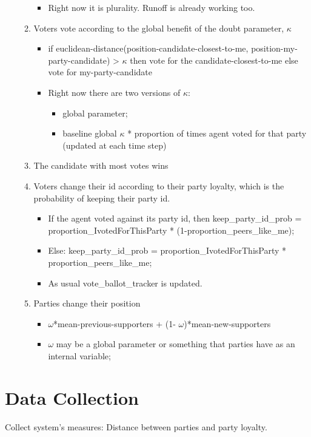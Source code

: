\documentclass[11pt]{article}
\begin{document}
\begin{itemize}
\begin{enumerate}
\begin{itemize}
\item Right now it is plurality. Runoff is already working too.
\end{itemize}
\item Voters vote according to the global benefit of the doubt parameter, \(\kappa\)
\begin{itemize}
\item if euclidean-distance(position-candidate-closest-to-me, position-my-party-candidate) > \(\kappa\) then vote for the candidate-closest-to-me else vote for my-party-candidate
\item Right now there are two versions of  \(\kappa\):
\begin{itemize}
\item global parameter;
\item baseline global \(\kappa\) * proportion of times agent voted for that party (updated at each time step)
\end{itemize}
\end{itemize}
    \item The candidate with most votes wins

    \item Voters change their id according to their party loyalty, which is the
          probability of keeping their party id.

\begin{itemize}
  \item If the agent voted against its party id, then keep\_party\_id\_prob =
        proportion\_IvotedForThisParty * (1-proportion\_peers\_like\_me);
  \item Else: keep\_party\_id\_prob = proportion\_IvotedForThisParty * proportion\_peers\_like\_me;
  \item As usual  vote\_ballot\_tracker is updated.
\end{itemize}

\item Parties change their position
\begin{itemize}
  \item \(\omega\)*mean-previous-supporters + (1- \(\omega\))*mean-new-supporters
  \item \(\omega\) may be a global parameter or something that parties have as an
        internal variable;
\end{itemize}

\end{enumerate}
\end{itemize}

\section{Data Collection}

Collect system's measures: Distance between parties and party loyalty.
\end{document}
